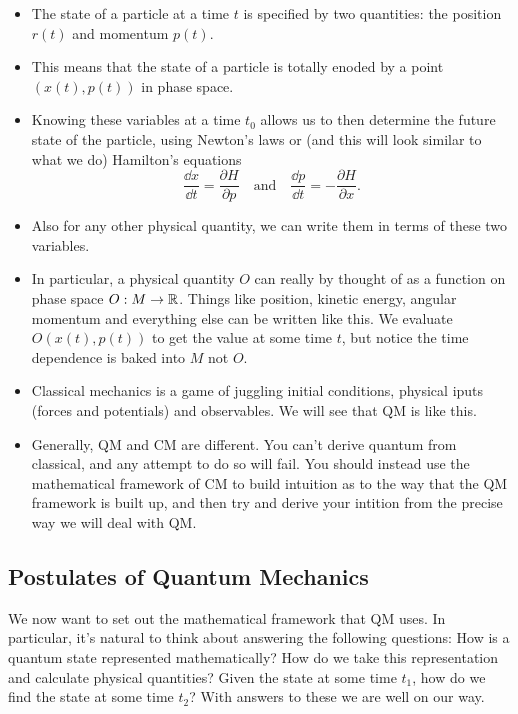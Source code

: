 \documentclass[a4paper]{scrartcl}
\begin{document}
{\color{blue}
\begin{itemize}
\item The state of a particle at a time $t$ is specified by two quantities: the position $r(t)$ and momentum $p(t)$.
\item This means that the state of a particle is totally enoded by a point $(x(t), p(t))$ in phase space. 
\item Knowing these variables at a time $t_0$ allows us to then determine the future state of the particle, using Newton's laws or (and this will look similar to what we do) Hamilton's equations
$$
\frac{\dd x}{\dd t} = \frac{\partial H}{\partial p} \quad \text{and} \quad \frac{\dd p}{\dd t} = - \frac{\partial H}{\partial x}.
$$
\item Also for any other physical quantity, we can write them in terms of these two variables. 
\item In particular, a physical quantity $O$ can really by thought of as a function on phase space $O: M \rightarrow \mathbb{R}$. Things like position, kinetic energy, angular momentum and everything else can be written like this. We evaluate $O(x(t), p(t))$ to get the value at some time $t$, but notice the time dependence is baked into $M$ not $O$.
\item Classical mechanics is a game of juggling initial conditions, physical iputs (forces and potentials) and observables. We will see that QM is like this.
\item Generally, QM and CM are different. You can't derive quantum from classical, and any attempt to do so will fail. You should instead use the mathematical framework of CM to build intuition as to the way that the QM framework is built up, and then try and derive your intition from the precise way we will deal with QM.
\end{itemize}
}

\subsection{Postulates of Quantum Mechanics}

We now want to set out the mathematical framework that QM uses. {\color{blue}In particular, it's natural to think about answering the following questions: How is a quantum state represented mathematically? How do we take this representation and calculate physical quantities? Given the state at some time $t_1$, how do we find the state at some time $t_2$? With answers to these we are well on our way.
}
\end{document}
